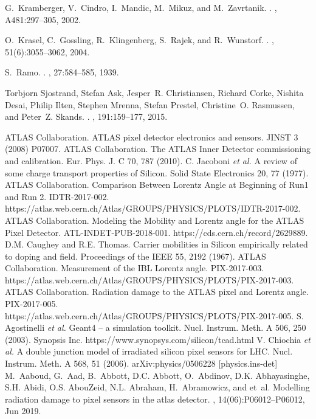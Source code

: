 \begin{thebibliography}{99}
G.~Kramberger, V.~Cindro, I.~Mandic, M.~Mikuz, and M.~Zavrtanik.
.
, A481:297--305, 2002.

O.~Krasel, C.~Gossling, R.~Klingenberg, S.~Rajek, and R.~Wunstorf.
.
, 51(6):3055--3062, 2004.

S.~Ramo.
.
, 27:584--585, 1939.

Torbjorn Sjostrand, Stefan Ask, Jesper~R. Christiansen, Richard Corke, Nishita
  Desai, Philip Ilten, Stephen Mrenna, Stefan Prestel, Christine~O. Rasmussen,
  and Peter~Z. Skands.
.
, 191:159--177, 2015.


 ATLAS Collaboration. ATLAS pixel detector electronics and sensors. JINST 3 (2008) P07007.
 ATLAS Collaboration. The ATLAS Inner Detector commissioning and calibration. Eur. Phys. J. C 70, 787 (2010).
 C. Jacoboni \emph{et al.} A review of some charge transport properties of Silicon. Solid State Electronics 20, 77 (1977).
 ATLAS Collaboration. Comparison Between Lorentz Angle at Beginning of Run1 and Run 2. IDTR-2017-002. https://atlas.web.cern.ch/Atlas/GROUPS/PHYSICS/PLOTS/IDTR-2017-002.
 ATLAS Collaboration. Modeling the Mobility and Lorentz angle for the ATLAS Pixel Detector. ATL-INDET-PUB-2018-001. https://cds.cern.ch/record/2629889.
 D.M. Caughey and R.E. Thomas. Carrier mobilities in Silicon empirically related to doping and field. Proceedings of the IEEE 55, 2192 (1967).
 ATLAS Collaboration. Measurement of the IBL Lorentz angle. PIX-2017-003. https://atlas.web.cern.ch/Atlas/GROUPS/PHYSICS/PLOTS/PIX-2017-003.
 ATLAS Collaboration. Radiation damage to the ATLAS pixel and Lorentz angle. PIX-2017-005. https://atlas.web.cern.ch/Atlas/GROUPS/PHYSICS/PLOTS/PIX-2017-005.
 S. Agostinelli \emph{et al.} Geant4 -- a simulation toolkit. Nucl. Instrum. Meth. A 506, 250 (2003).
 Synopsis Inc. https://www.synopsys.com/silicon/tcad.html
 V. Chiochia \emph{et al.} A double junction model of irradiated silicon pixel sensors for LHC. Nucl. Instrum. Meth. A 568, 51 (2006). arXiv:physics/0506228 [physics.ins-det]
M.~Aaboud, G.~Aad, B.~Abbott, D.C. Abbott, O.~Abdinov, D.K. Abhayasinghe, S.H.
  Abidi, O.S. AbouZeid, N.L. Abraham, H.~Abramowicz, and et~al.
\newblock Modelling radiation damage to pixel sensors in the atlas detector.
, 14(06):P06012–P06012, Jun 2019.


\end{thebibliography}
